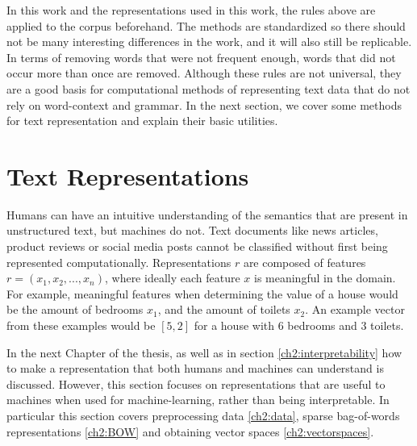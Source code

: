 
In this work and the representations used in this work, the  rules above are applied to the corpus beforehand. The methods are standardized so there should not be many interesting differences in the work, and it will also still be replicable. In terms of removing words that were not frequent enough, words that did not occur more than once are removed.  Although these rules are not universal, they are a good basis for computational methods of representing text data that do not rely on word-context and grammar. In the next section, we cover some  methods for text representation and explain their basic utilities.  %

\section{Text Representations}\label{ch2:representations}




Humans can have an intuitive understanding of the semantics that are present in unstructured text, but machines do not.  Text documents like news articles, product reviews or social media posts cannot be classified without first being represented computationally.  Representations $r$ are composed of features $r = (x_1, x_2, ..., x_n)$, where ideally each feature $x$  is meaningful in the domain. For example, meaningful features when determining the  value of a house would be the amount of bedrooms $x_1$, and the amount of toilets $x_2$. An example vector from these examples would be $[5,2]$ for a house with 6 bedrooms and 3 toilets.


In the next Chapter of the thesis, as well as in section \ref{ch2:interpretability} how to make a representation that both humans and machines can understand is discussed. However,  this section  focuses on representations that are useful to machines when used for machine-learning, rather than being interpretable. In particular this section covers preprocessing data \ref{ch2:data}, sparse bag-of-words representations \ref{ch2:BOW} and obtaining vector spaces \ref{ch2:vectorspaces}.







